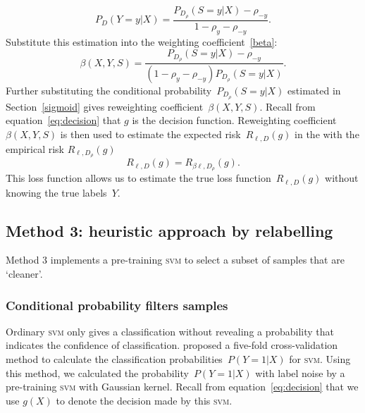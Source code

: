\documentclass[12pt]{article} %
\newcommand{\svm}{\textsc{svm}}
\newcommand{\loss}{\ell}
\begin{document}
\begin{equation}
    P_D(Y=y|X)=\frac{P_{D_\rho}(S=y|X)-\rho_{-y}}{1-\rho_{y}-\rho_{-y}}.
\end{equation}
Substitute this estimation into the weighting coefficient~\eqref{beta}:
\begin{equation} \label{eq:weighting}
    \beta(X,Y,S)=\frac{P_{D_\rho}(S=y|X)-\rho_{-y}}{(1-\rho_{y}-\rho_{-y})P_{D_\rho}(S=y|X)}.
\end{equation}
Further substituting the conditional probability~$P_{D_\rho}(S=y|X)$ estimated in Section~\ref{sigmoid} gives reweighting coefficient~$\beta(X,Y,S)$.
Recall from equation~\eqref{eq:decision} that  $g$ is the decision function.
Reweighting coefficient~$\beta(X,Y,S)$ is then used to estimate the expected risk~$R_{\loss,D}(g)$ in the with the empirical risk $R_{\loss,D_\rho}(g)$
\begin{equation}
R_{\loss,D}(g) = R_{\beta \loss,D_\rho}(g). \label{eq:loss}
\end{equation}
This loss function allows us to estimate the true loss function~$R_{\loss,D}(g)$ without knowing the true labels~$Y$.

\subsection{Method 3: heuristic approach by relabelling}\label{2nd}
Method 3 implements a pre-training \textsc{svm} to select a subset of samples that are `cleaner'.

\subsubsection{Conditional probability filters samples}\label{2nd2}
Ordinary \textsc{svm} only gives a classification without revealing a probability that indicates the confidence of classification.
\citet{Wu03probabilityestimates} proposed a five-fold cross-validation method to calculate the classification probabilities~$P(Y=1|X)$ for \textsc{svm}.
Using this method, we calculated the probability~$P(Y=1|X)$ with label noise by a pre-training \textsc{svm} with Gaussian kernel. Recall from equation~\eqref{eq:decision} that we use $g(X)$ to denote the decision made by this \svm .
\end{document}
